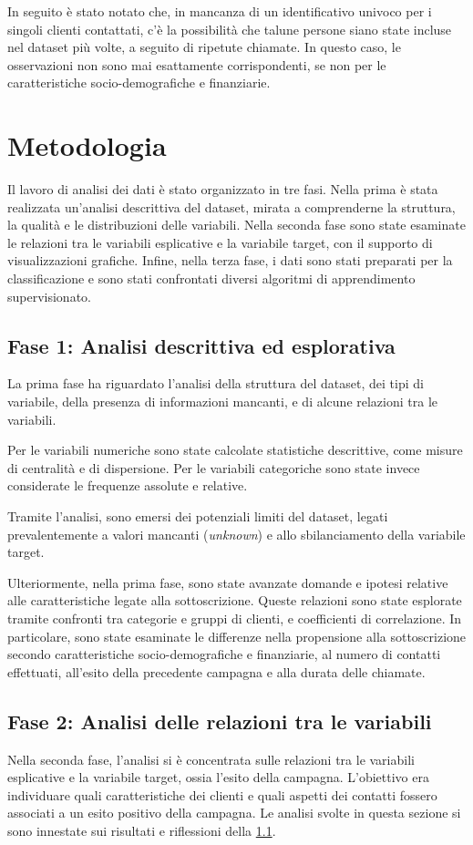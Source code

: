 \documentclass[11,5pt, a4paper]{article}
\begin{document}
In seguito è stato notato che, in mancanza di un identificativo univoco per i singoli clienti contattati, c'è la possibilità che talune persone siano state incluse nel dataset più volte, a seguito di ripetute chiamate. In questo caso, le osservazioni non sono mai esattamente corrispondenti, se non per le caratteristiche socio-demografiche e finanziarie.

\section{Metodologia}
Il lavoro di analisi dei dati è stato organizzato in tre fasi. Nella prima è stata realizzata un'analisi descrittiva del dataset, mirata a comprenderne la struttura, la qualità e le distribuzioni delle variabili. Nella seconda fase sono state esaminate le relazioni tra le variabili esplicative e la variabile target, con il supporto di visualizzazioni grafiche. Infine, nella terza fase, i dati sono stati preparati per la classificazione e sono stati confrontati diversi algoritmi di apprendimento supervisionato.

\subsection{Fase 1: Analisi descrittiva ed esplorativa}
\label{ss: Fase 1}
La prima fase ha riguardato l'analisi della struttura del dataset, dei tipi di variabile, della presenza di informazioni mancanti, e di alcune relazioni tra le variabili. 

Per le variabili numeriche sono state calcolate statistiche descrittive, come misure di centralità e di dispersione. Per le variabili categoriche sono state invece considerate le frequenze assolute e relative.

Tramite l'analisi, sono emersi dei potenziali limiti del dataset, legati prevalentemente a valori mancanti (\textit{unknown}) e allo sbilanciamento della variabile target.

Ulteriormente, nella prima fase, sono state avanzate domande e ipotesi relative alle caratteristiche legate alla sottoscrizione. Queste relazioni sono state esplorate tramite confronti tra categorie e gruppi di clienti, e coefficienti di correlazione. In particolare, sono state esaminate le differenze nella propensione alla sottoscrizione secondo caratteristiche socio-demografiche e finanziarie, al numero di contatti effettuati, all'esito della precedente campagna e alla durata delle chiamate.

\subsection{Fase 2: Analisi delle relazioni tra le variabili}
\label{ss:Fase2}
Nella seconda fase, l'analisi si è concentrata sulle relazioni tra le variabili esplicative e la variabile target, ossia l'esito della campagna. 
L'obiettivo era individuare quali caratteristiche dei clienti e quali aspetti dei contatti fossero associati a un esito positivo della campagna. Le analisi svolte in questa sezione si sono innestate sui risultati e riflessioni della \ref{ss: Fase 1}.
\end{document}
